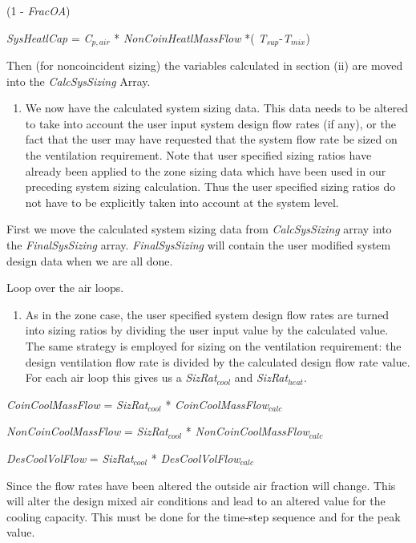 (1 - \emph{FracOA})

\emph{SysHeatlCap} = \emph{C\(_{p,air}\)} * \emph{NonCoinHeatlMassFlow} *( \emph{T\(_{sup}\)}-\emph{T\(_{mix}\)})

Then (for noncoincident sizing) the variables calculated in section (ii) are moved into the \emph{CalcSysSizing} Array.

\begin{enumerate}
\def\labelenumi{(\arabic{enumi})}
\setcounter{enumi}{1}
\tightlist
\item
  We now have the calculated system sizing data. This data needs to be altered to take into account the user input system design flow rates (if any), or the fact that the user may have requested that the system flow rate be sized on the ventilation requirement. Note that user specified sizing ratios have already been applied to the zone sizing data which have been used in our preceding system sizing calculation. Thus the user specified sizing ratios do not have to be explicitly taken into account at the system level.
\end{enumerate}

First we move the calculated system sizing data from \emph{CalcSysSizing} array into the \emph{FinalSysSizing} array. \emph{FinalSysSizing} will contain the user modified system design data when we are all done.

Loop over the air loops.

\begin{enumerate}
\def\labelenumi{(\roman{enumi})}
\tightlist
\setlength\itemindent{25pt} \item As in the zone case, the user specified system design flow rates are turned into sizing ratios by dividing the user input value by the calculated value. The same strategy is employed for sizing on the ventilation requirement: the design ventilation flow rate is divided by the calculated design flow rate value. For each air loop this gives us a \emph{SizRat\(_{cool}\)} and \emph{SizRat\(_{heat}\)}.
\end{enumerate}

\emph{CoinCoolMassFlow} = \emph{SizRat\(_{cool}\)} * \emph{CoinCoolMassFlow\(_{calc}\)}

\emph{NonCoinCoolMassFlow} = \emph{SizRat\(_{cool}\)} * \emph{NonCoinCoolMassFlow\(_{calc}\)}

\emph{DesCoolVolFlow} = \emph{SizRat\(_{cool}\)} * \emph{DesCoolVolFlow\(_{calc}\)}

Since the flow rates have been altered the outside air fraction will change. This will alter the design mixed air conditions and lead to an altered value for the cooling capacity. This must be done for the time-step sequence and for the peak value.

